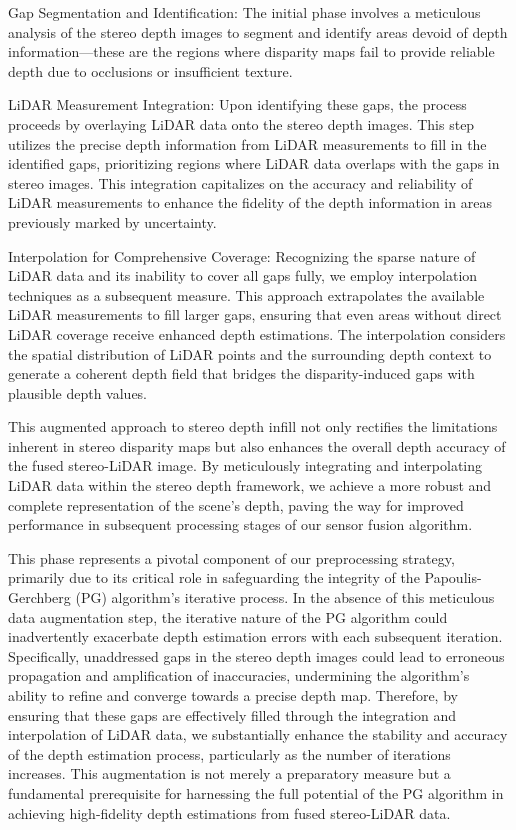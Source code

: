 \documentclass[conference]{IEEEtran}
\begin{document}
Gap Segmentation and Identification: The initial phase involves a meticulous analysis of the stereo depth images to segment and identify areas devoid of depth information—these are the regions where disparity maps fail to provide reliable depth due to occlusions or insufficient texture.

LiDAR Measurement Integration: Upon identifying these gaps, the process proceeds by overlaying LiDAR data onto the stereo depth images. This step utilizes the precise depth information from LiDAR measurements to fill in the identified gaps, prioritizing regions where LiDAR data overlaps with the gaps in stereo images. This integration capitalizes on the accuracy and reliability of LiDAR measurements to enhance the fidelity of the depth information in areas previously marked by uncertainty.

Interpolation for Comprehensive Coverage: Recognizing the sparse nature of LiDAR data and its inability to cover all gaps fully, we employ interpolation techniques as a subsequent measure. This approach extrapolates the available LiDAR measurements to fill larger gaps, ensuring that even areas without direct LiDAR coverage receive enhanced depth estimations. The interpolation considers the spatial distribution of LiDAR points and the surrounding depth context to generate a coherent depth field that bridges the disparity-induced gaps with plausible depth values.

This augmented approach to stereo depth infill not only rectifies the limitations inherent in stereo disparity maps but also enhances the overall depth accuracy of the fused stereo-LiDAR image. By meticulously integrating and interpolating LiDAR data within the stereo depth framework, we achieve a more robust and complete representation of the scene's depth, paving the way for improved performance in subsequent processing stages of our sensor fusion algorithm.

This phase represents a pivotal component of our preprocessing strategy, primarily due to its critical role in safeguarding the integrity of the Papoulis-Gerchberg (PG) algorithm's iterative process. In the absence of this meticulous data augmentation step, the iterative nature of the PG algorithm could inadvertently exacerbate depth estimation errors with each subsequent iteration. Specifically, unaddressed gaps in the stereo depth images could lead to erroneous propagation and amplification of inaccuracies, undermining the algorithm's ability to refine and converge towards a precise depth map. Therefore, by ensuring that these gaps are effectively filled through the integration and interpolation of LiDAR data, we substantially enhance the stability and accuracy of the depth estimation process, particularly as the number of iterations increases. This augmentation is not merely a preparatory measure but a fundamental prerequisite for harnessing the full potential of the PG algorithm in achieving high-fidelity depth estimations from fused stereo-LiDAR data.
\end{document}
